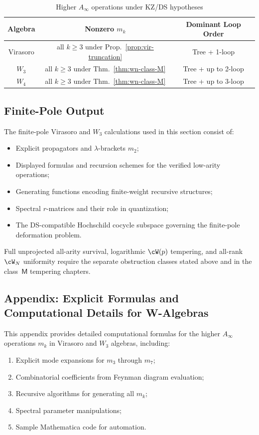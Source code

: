 \begin{table}[h]
\centering
\caption{Higher $A_\infty$ operations under KZ/DS hypotheses}
\begin{tabular}{|c|c|c|}
\hline
Algebra & Nonzero $m_k$ & Dominant Loop Order \\
\hline
Virasoro & all $k \geq 3$ under Prop.~\ref{prop:vir-truncation} & Tree + 1-loop \\
$W_3$ & all $k \geq 3$ under Thm.~\ref{thm:wn-class-M} & Tree + up to 2-loop \\
$W_4$ & all $k \geq 3$ under Thm.~\ref{thm:wn-class-M} & Tree + up to 3-loop \\
\hline
\end{tabular}
\end{table}

\subsection{Finite-Pole Output}

The finite-pole Virasoro and $W_3$ calculations used in this section
consist of:
\begin{itemize}
\item Explicit propagators and $\lambda$-brackets $m_2$;
\item Displayed formulas and recursion schemes for the verified
low-arity operations;
\item Generating functions encoding finite-weight recursive structures;
\item Spectral $r$-matrices and their role in quantization;
\item The DS-compatible Hochschild cocycle subspace governing the
finite-pole deformation problem.
\end{itemize}

Full unprojected all-arity survival, logarithmic $\cW(p)$ tempering,
and all-rank $\cW_N$ uniformity require the separate obstruction
classes stated above and in the class~$\mathsf{M}$ tempering chapters.



\subsection*{Appendix: Explicit Formulas and Computational Details for W-Algebras}

This appendix provides detailed computational formulas for the higher $A_\infty$ operations $m_k$ in Virasoro and $W_3$ algebras, including:
\begin{enumerate}
\item Explicit mode expansions for $m_3$ through $m_7$;
\item Combinatorial coefficients from Feynman diagram evaluation;
\item Recursive algorithms for generating all $m_k$;
\item Spectral parameter manipulations;
\item Sample Mathematica code for automation.
\end{enumerate}

